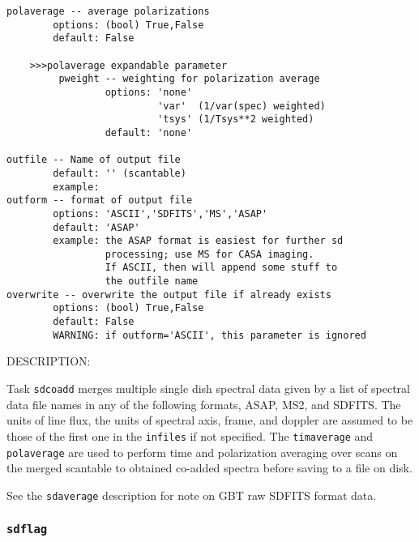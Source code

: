\begin{verbatim}
polaverage -- average polarizations
        options: (bool) True,False
        default: False

    >>>polaverage expandable parameter
         pweight -- weighting for polarization average
                 options: 'none'
                          'var'  (1/var(spec) weighted)
                          'tsys' (1/Tsys**2 weighted)
                 default: 'none'

outfile -- Name of output file
        default: '' (scantable)
        example:
outform -- format of output file
        options: 'ASCII','SDFITS','MS','ASAP'
        default: 'ASAP'
        example: the ASAP format is easiest for further sd
                 processing; use MS for CASA imaging.
                 If ASCII, then will append some stuff to
                 the outfile name
overwrite -- overwrite the output file if already exists
        options: (bool) True,False
        default: False
        WARNING: if outform='ASCII', this parameter is ignored 
\end{verbatim}

DESCRIPTION:

Task {\tt sdcoadd} merges multiple single dish spectral data given by
a list of spectral data file names in any of the following formats,
ASAP, MS2, and SDFITS.
The units of line flux, the units of spectral axis, frame, and doppler
are assumed to be those of the first one in the {\tt infiles} if not
specified.
The {\tt timaverage} and {\tt polaverage} are used to perform time
and polarization averaging over scans on the merged scantable to 
obtained co-added spectra before saving to a file on disk.

See the {\tt sdaverage} description for note on GBT raw SDFITS format data.


\subsubsection{{\tt sdflag}}
\label{section:sd.sdtasks.tasks.sdflag}

